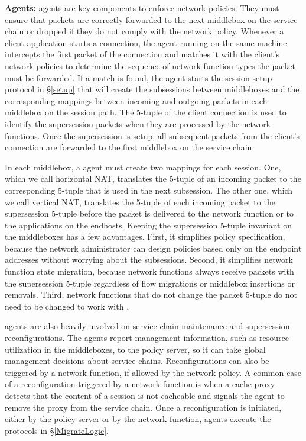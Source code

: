{\bf \system Agents:} \system  agents  are key components to   enforce
network  policies.   They  must  ensure  that   packets are  correctly
forwarded  to the next  middlebox on the  service chain  or dropped if
they  do  not  comply with  the network   policy.   Whenever  a client
application starts a connection, the \system agent running on the same
machine intercepts  the first packet of the  connection and matches it
with  the client's   network  policies to   determine the  sequence of
network function types  the packet must be  forwarded.  If  a match is
found, the  agent starts the  session  setup protocol in \S\ref{setup}
that will  create    the  subsessions between   middleboxes  and   the
corresponding  mappings between incoming and  outgoing packets in each
middlebox on the session path.   The 5-tuple of the client  connection
is used  to identify the supersession  packets when they are processed
by   the network functions.   Once   the  supersession  is  setup, all
subsequent  packets from the  client's connection are forwarded to the
first middlebox on the service chain.

In each middlebox, a  \system agent must  create two mappings for each
session. One, which we call horizontal NAT,  translates the 5-tuple of
an incoming  packet to the corresponding 5-tuple  that is  used in the
next   subsession.  The   other one,  which   we  call vertical   NAT,
translates   the 5-tuple of each   incoming packet to the supersession
5-tuple before the  packet is delivered to the  network function or to
the applications on  the  endhosts.  Keeping the  supersession 5-tuple
invariant    on  the middleboxes  has  a    few advantages. First,  it
simplifies policy specification, because the network administrator can
design policies based only on the  endpoint addresses without worrying
about  the subsessions.  Second,  it simplifies network function state
migration, because network functions  always receive packets  with the
supersession  5-tuple   regardless of flow    migrations or  middlebox
insertions  or removals.  Third,  network functions that do not change
the packet 5-tuple do not need to be changed to work with \system.

\system agents are also heavily involved  on service chain maintenance
and  supersession  reconfigurations.   The  agents report   management
information, such as resource utilization  in the middleboxes, to  the
policy server, so  it  can  take  global management  decisions   about
service chains.  Reconfigurations can  also be triggered by a  network
function,  if allowed  by  the network  policy.   A  common case  of a
reconfiguration triggered by a network function is  when a cache proxy
detects that the content of a session is not cacheable and signals the
\system agent to  remove the  proxy  from the service  chain.  Once  a
reconfiguration is  initiated, either by the policy   server or by the
network function,  \system      agents  execute the  protocols      in
\S\ref{MigrateLogic}.

